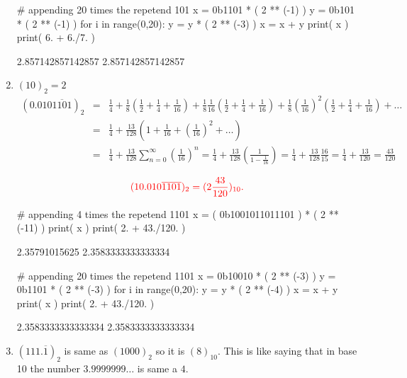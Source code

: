 \documentclass[pdftex,11pt]{article}
\begin{document}
\begin{enumerate}
\begin{python}
# appending 20 times the repetend 101
x = 0b1101 * ( 2 ** (-1) )
y = 0b101 * ( 2 ** (-1) )
for i in range(0,20):
  y = y * ( 2 ** (-3) )
  x = x + y
print( x )
print( 6. + 6./7. )
\end{python}
\begin{pythonoutput}
2.857142857142857
2.857142857142857
\end{pythonoutput}


\item 
$(10)_2 = 2 $
\begin{eqnarray}
(0.010\overline{1101})_{2} 
\nonumber & = & 
\frac{1}{4}+
\frac{1}{8}\left(\frac{1}{2}+ \frac{1}{4}+\frac{1}{16}\right)
+ \frac{1}{8}\frac{1}{16}\left(\frac{1}{2}+ \frac{1}{4}+\frac{1}{16}\right)
+ \frac{1}{8}\left(\frac{1}{16}\right)^2\left(\frac{1}{2}+ \frac{1}{4}+\frac{1}{16}\right)
+ \ldots\\
\nonumber & = & 
\frac{1}{4}+ \frac{13}{128}\left(1 + \frac{1}{16}+ \left(\frac{1}{16}\right)^2+ \ldots \right)\\
\nonumber & = &
\frac{1}{4}+  \frac{13}{128}\sum_{n=0}^\infty\left(\frac{1}{16}\right)^n
 = \frac{1}{4}+  \frac{13}{128}\left(\frac{1}{1-\frac{1}{16}}\right)
 = \frac{1}{4}+  \frac{13}{128}\frac{16}{15}
 = \frac{1}{4}+  \frac{13}{120}
 = \frac{43}{120}
\end{eqnarray}

$$\color{red}(10.010\overline{1101})_2 = (2\frac{43}{120})_{10} .$$



\begin{python}
# appending 4 times the repetend 1101
x = ( 0b1001011011101 ) * ( 2 ** (-11) )
print( x )
print( 2. + 43./120. )
\end{python}
\begin{pythonoutput}
2.35791015625
2.3583333333333334
\end{pythonoutput}

\begin{python}
# appending 20 times the repetend 1101
x = 0b10010 * ( 2 ** (-3) )
y = 0b1101 * ( 2 ** (-3) )
for i in range(0,20):
  y = y * ( 2 ** (-4) )
  x = x + y
print( x )
print( 2. + 43./120. )
\end{python}
\begin{pythonoutput}
2.3583333333333334
2.3583333333333334
\end{pythonoutput}





\item 
$(111.\overline{1})_2$ is same as $(1000)_2$ so it is $(8)_{10}$.
This is like saying that in base 10 the number $3.9999999\ldots$ is same a $4$.\\


\end{enumerate}
\end{document}
